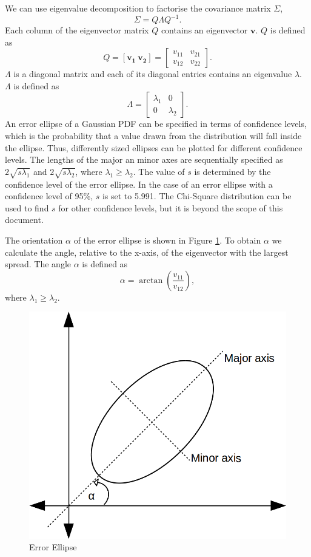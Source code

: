 \documentclass[12pt,oneside,openany,a4paper, %
afrikaans,english,
]{memoir}
\numberwithin{equation}{chapter}
\begin{document}
We can use eigenvalue decomposition to factorise the covariance matrix $\Sigma$,
\begin{equation}
\Sigma = Q\Lambda Q^{-1}.
\end{equation}
Each column of the eigenvector matrix $Q$ contains an eigenvector $\bm{v}$. $Q$ is defined as
\begin{equation}
Q =
[\bm{v_1} \ \bm{v_2}]
=
\begin{bmatrix}
v_{11} & v_{21}\\
v_{12} & v_{22}
\end{bmatrix}.
\end{equation}
$\Lambda$ is a diagonal matrix and each of its diagonal entries contains an eigenvalue $\lambda$. $\Lambda$ is defined as 
\begin{equation}
\Lambda =
\begin{bmatrix}
\lambda_1 & 0\\
0 & \lambda_2
\end{bmatrix}.
\end{equation}
An error ellipse of a Gaussian PDF can be specified in terms of confidence levels, which is the probability that a value drawn from the distribution will fall inside the ellipse. Thus, differently sized ellipses can be plotted for different confidence levels. The lengths of the major an minor axes are sequentially specified as $2\sqrt{s\lambda_1}$ and $2\sqrt{s\lambda_2}$, where $\lambda_1 \geq \lambda_2$. The value of $s$ is determined by the confidence level of the error ellipse. In the case of an error ellipse with a confidence level of 95\%, $s$ is set to 5.991. The Chi-Square distribution can be used to find $s$ for other confidence levels, but it is beyond the scope of this document.

The orientation $\alpha$ of the error ellipse is shown in Figure \ref{fig:e_ellipse}. To obtain $\alpha$ we calculate the angle, relative to the x-axis, of the eigenvector with the largest spread. The angle $\alpha$ is defined as
\begin{equation}
\alpha = \arctan\left(\frac{v_{11}}{v_{12}}\right),
\end{equation}
where $\lambda_1 \geq \lambda_2$.

\begin{figure}[H]
  \includegraphics[width=0.5\linewidth]{Figures/e_ellipse.png}
  \centering
  \caption{Error Ellipse}
  \label{fig:e_ellipse}
\end{figure}
\end{document}
